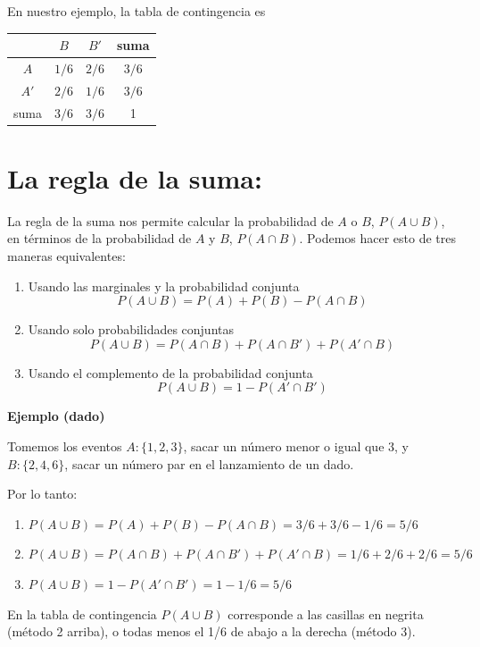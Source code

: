 \documentclass[
]{book}
\begin{document}
En nuestro ejemplo, la tabla de contingencia es

\begin{longtable}[]{@{}cccc@{}}
\toprule\noalign{}
& \(B\) & \(B'\) & suma \\
\midrule\noalign{}
\endhead
\bottomrule\noalign{}
\endlastfoot
\(A\) & \(1/6\) & \(2/6\) & \(3/6\) \\
\(A'\) & \(2/6\) & \(1/6\) & \(3/6\) \\
suma & \(3/6\) & \(3/6\) & 1 \\
\end{longtable}

\hypertarget{la-regla-de-la-suma}{%
\section{La regla de la suma:}\label{la-regla-de-la-suma}}

La regla de la suma nos permite calcular la probabilidad de \(A\) o \(B\), \(P(A \cup B)\), en términos de la probabilidad de \(A\) y \(B\), \(P(A \cap B)\). Podemos hacer esto de tres maneras equivalentes:

\begin{enumerate}
\def\labelenumi{\arabic{enumi})}
\item
  Usando las marginales y la probabilidad conjunta
  \[P(A \cup B)=P(A) + P(B) - P(A\cap B)\]
\item
  Usando solo probabilidades conjuntas
  \[P(A \cup B)=P(A \cap B)+P(A\cap B')+P(A'\cap B)\]
\item
  Usando el complemento de la probabilidad conjunta
  \[P(A \cup B)=1-P(A'\cap B')\]
\end{enumerate}

\textbf{Ejemplo (dado)}

Tomemos los eventos \(A:\{1,2,3\}\), sacar un número menor o igual que \(3\), y \(B:\{2,4,6\}\), sacar un número par en el lanzamiento de un dado.

Por lo tanto:

\begin{enumerate}
\def\labelenumi{\arabic{enumi})}
\item
  \(P(A \cup B)=P(A) + P(B) - P(A\cap B)=3/6+3/6-1/6=5/6\)
\item
  \(P(A \cup B)=P(A \cap B)+P(A\cap B')+P(A'\cap B)=1/6+2/6+2/6=5/6\)
\item
  \(P(A \cup B)=1-P(A'\cap B')= 1-1/6=5/6\)
\end{enumerate}

En la tabla de contingencia \(P(A \cup B)\) corresponde a las casillas en negrita (método 2 arriba), o todas menos el 1/6 de abajo a la derecha (método 3).
\end{document}
